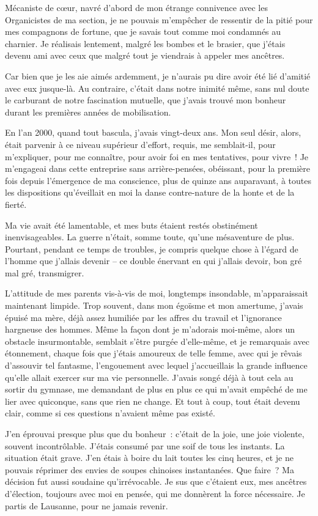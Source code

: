 \documentclass[
  extrafontsizes,
  oneside,
  14pt
]{memoir}
\begin{document}
Mécaniste de cœur, navré d'abord de mon étrange connivence avec les
Organicistes de ma section, je ne pouvais m'empêcher de ressentir de la pitié
pour mes compagnons de fortune, que je savais tout comme moi condamnés au
charnier. Je réalisais lentement, malgré les bombes et le brasier, que j'étais
devenu ami avec ceux que malgré tout je viendrais à appeler mes ancêtres.

Car bien que je les aie aimés ardemment, je n'aurais pu dire avoir été lié
d'amitié avec eux jusque-là. Au contraire, c'était dans notre inimité même,
sans nul doute le carburant de notre fascination mutuelle, que j'avais trouvé
mon bonheur durant les premières années de mobilisation.

En l'an 2000, quand tout bascula, j'avais vingt-deux ans. Mon seul désir,
alors, était parvenir à ce niveau supérieur d'effort, requis, me semblait-il,
pour m'expliquer, pour me connaître, pour avoir foi en mes tentatives, pour
vivre~! Je m'engageai dans cette entreprise sans arrière-pensées, obéissant,
pour la première fois depuis l'émergence de ma conscience, plus de quinze ans
auparavant, à toutes les dispositions qu'éveillait en moi la danse
contre-nature de la honte et de la fierté.

Ma vie avait été lamentable, et mes buts étaient restés obstinément
inenvisageables. La guerre n'était, somme toute, qu'une mésaventure de plus.
Pourtant, pendant ce temps de troubles, je compris quelque chose à l'égard de
l'homme que j'allais devenir -- ce double énervant en qui j'allais devoir, bon
gré mal gré, transmigrer.

L'attitude de mes parents vis-à-vis de moi, longtemps insondable,
m'apparaissait maintenant limpide. Trop souvent, dans mon égoïsme et mon
amertume, j'avais épuisé ma mère, déjà assez humiliée par les affres du
travail et l'ignorance hargneuse des hommes. Même la façon dont je
m'adorais moi-même, alors un obstacle insurmontable, semblait s'être
purgée d'elle-même, et je remarquais avec étonnement, chaque fois que
j'étais amoureux de telle femme, avec qui je rêvais d'assouvir tel
fantasme, l'engouement avec lequel j'accueillais la grande influence
qu'elle allait exercer sur ma vie personnelle. J'avais songé déjà à tout
cela au sortir du gymnase, me demandant de plus en plus ce qui m'avait
empêché de me lier avec quiconque, sans que rien ne change. Et tout à
coup, tout était devenu clair, comme si ces questions n'avaient même pas
existé.

J'en éprouvai presque plus que du bonheur~: c'était de la joie, une joie
violente, souvent incontrôlable. J'étais consumé par une soif de tous les
instants. La situation était grave. J'en étais à boire du lait toutes les cinq
heures, et je ne pouvais réprimer des envies de soupes chinoises instantanées.
Que faire~? Ma décision fut aussi soudaine qu'irrévocable. Je sus que c'étaient
eux, mes ancêtres d'élection, toujours avec moi en pensée, qui me donnèrent la
force nécessaire. Je partis de Lausanne, pour ne jamais revenir.
\end{document}

